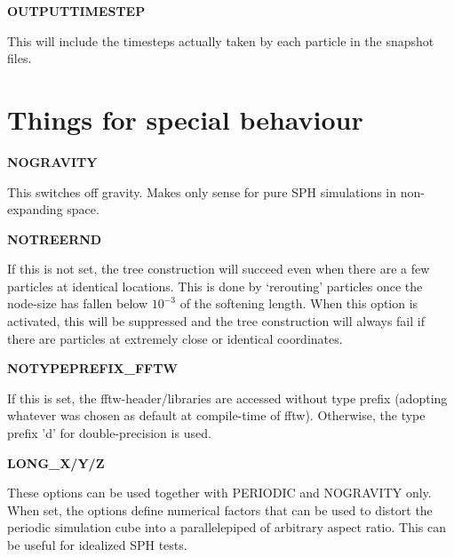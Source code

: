 \begin{DoxyItemize}
\item {\bfseries \-O\-U\-T\-P\-U\-T\-T\-I\-M\-E\-S\-T\-E\-P} \par
 \-This will include the timesteps actually taken by each particle in the snapshot files.
\end{DoxyItemize}

\par
 \hypertarget{Gadget-Makefile_secmake7}{}\section{\-Things for special behaviour}\label{Gadget-Makefile_secmake7}

\begin{DoxyItemize}
\item {\bfseries \-N\-O\-G\-R\-A\-V\-I\-T\-Y} \par
 \-This switches off gravity. \-Makes only sense for pure \-S\-P\-H simulations in non-\/expanding space.
\end{DoxyItemize}


\begin{DoxyItemize}
\item {\bfseries \-N\-O\-T\-R\-E\-E\-R\-N\-D} \par
 \-If this is not set, the tree construction will succeed even when there are a few particles at identical locations. \-This is done by `rerouting' particles once the node-\/size has fallen below $10^{-3}$ of the softening length. \-When this option is activated, this will be suppressed and the tree construction will always fail if there are particles at extremely close or identical coordinates.
\end{DoxyItemize}


\begin{DoxyItemize}
\item {\bfseries \-N\-O\-T\-Y\-P\-E\-P\-R\-E\-F\-I\-X\-\_\-\-F\-F\-T\-W} \par
 \-If this is set, the fftw-\/header/libraries are accessed without type prefix (adopting whatever was chosen as default at compile-\/time of fftw). \-Otherwise, the type prefix 'd' for double-\/precision is used.
\end{DoxyItemize}


\begin{DoxyItemize}
\item {\bfseries \-L\-O\-N\-G\-\_\-\-X/\-Y/\-Z} \par
 \-These options can be used together with \-P\-E\-R\-I\-O\-D\-I\-C and \-N\-O\-G\-R\-A\-V\-I\-T\-Y only. \-When set, the options define numerical factors that can be used to distort the periodic simulation cube into a parallelepiped of arbitrary aspect ratio. \-This can be useful for idealized \-S\-P\-H tests.
\end{DoxyItemize}



